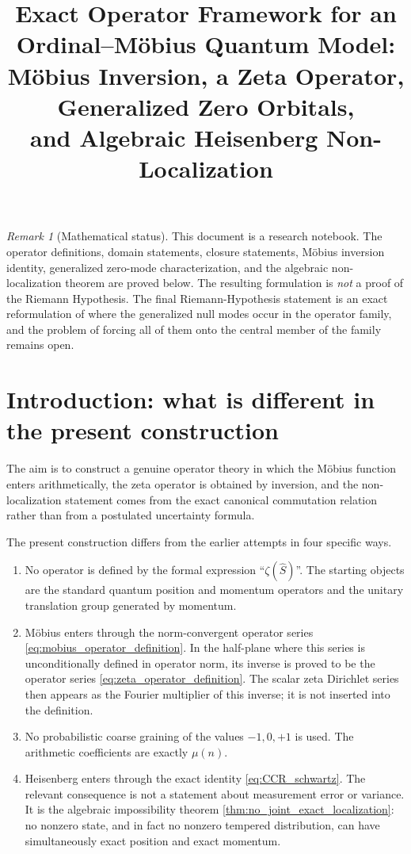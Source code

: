 \documentclass[11pt]{amsart}
\title[Ordinal--M\"obius Quantum Operator Framework]{
Exact Operator Framework for an Ordinal--M\"obius Quantum Model:\\
M\"obius Inversion, a Zeta Operator, Generalized Zero Orbitals,\\
and Algebraic Heisenberg Non-Localization
}
\author{}
\date{}
\numberwithin{equation}{section}
\theoremstyle{plain}
\theoremstyle{definition}
\theoremstyle{remark}
\newtheorem{remark}[theorem]{Remark}
\begin{document}
\maketitle

\tableofcontents

\bigskip

\begin{remark}[Mathematical status]
\label{rem:status}
This document is a research notebook.  The operator definitions, domain
statements, closure statements, M\"obius inversion identity, generalized
zero-mode characterization, and the algebraic non-localization theorem are
proved below.  The resulting formulation is \emph{not} a proof of the
Riemann Hypothesis.  The final Riemann-Hypothesis statement is an exact
reformulation of where the generalized null modes occur in the operator
family, and the problem of forcing all of them onto the central member of
the family remains open.
\end{remark}

\section{Introduction: what is different in the present construction}
\label{sec:introduction}

The aim is to construct a genuine operator theory in which the M\"obius
function enters arithmetically, the zeta operator is obtained by inversion,
and the non-localization statement comes from the exact canonical
commutation relation rather than from a postulated uncertainty formula.

The present construction differs from the earlier attempts in four
specific ways.

\begin{enumerate}[leftmargin=*]
\item No operator is defined by the formal expression
``$\zeta(\widehat S)$''.  The starting objects are the standard quantum
position and momentum operators and the unitary translation group generated
by momentum.

\item M\"obius enters through the norm-convergent operator series
\eqref{eq:mobius_operator_definition}.  In the half-plane where this series
is unconditionally defined in operator norm, its inverse is proved to be
the operator series \eqref{eq:zeta_operator_definition}.  The scalar zeta
Dirichlet series then appears as the Fourier multiplier of this inverse; it
is not inserted into the definition.

\item No probabilistic coarse graining of the values $-1,0,+1$ is used.
The arithmetic coefficients are exactly $\mu(n)$.

\item Heisenberg enters through the exact identity
\eqref{eq:CCR_schwartz}.  The relevant consequence is not a statement about
measurement error or variance.  It is the algebraic impossibility theorem
\ref{thm:no_joint_exact_localization}: no nonzero state, and in fact no
nonzero tempered distribution, can have simultaneously exact position and
exact momentum.
\end{enumerate}
\end{document}
